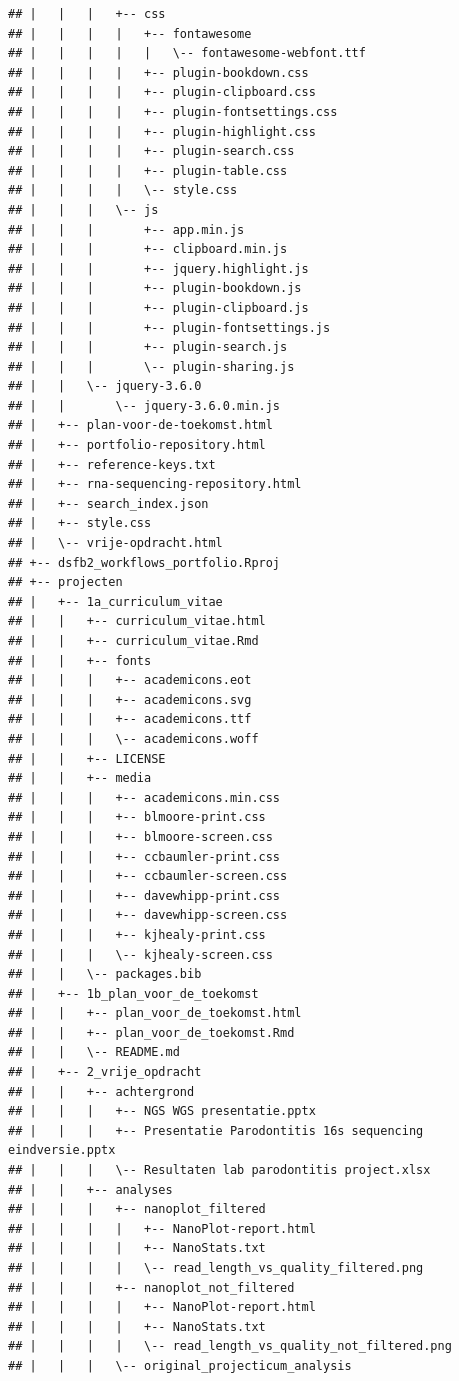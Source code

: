 \documentclass[
]{book}
\begin{document}
\begin{verbatim}
## |   |   |   +-- css
## |   |   |   |   +-- fontawesome
## |   |   |   |   |   \-- fontawesome-webfont.ttf
## |   |   |   |   +-- plugin-bookdown.css
## |   |   |   |   +-- plugin-clipboard.css
## |   |   |   |   +-- plugin-fontsettings.css
## |   |   |   |   +-- plugin-highlight.css
## |   |   |   |   +-- plugin-search.css
## |   |   |   |   +-- plugin-table.css
## |   |   |   |   \-- style.css
## |   |   |   \-- js
## |   |   |       +-- app.min.js
## |   |   |       +-- clipboard.min.js
## |   |   |       +-- jquery.highlight.js
## |   |   |       +-- plugin-bookdown.js
## |   |   |       +-- plugin-clipboard.js
## |   |   |       +-- plugin-fontsettings.js
## |   |   |       +-- plugin-search.js
## |   |   |       \-- plugin-sharing.js
## |   |   \-- jquery-3.6.0
## |   |       \-- jquery-3.6.0.min.js
## |   +-- plan-voor-de-toekomst.html
## |   +-- portfolio-repository.html
## |   +-- reference-keys.txt
## |   +-- rna-sequencing-repository.html
## |   +-- search_index.json
## |   +-- style.css
## |   \-- vrije-opdracht.html
## +-- dsfb2_workflows_portfolio.Rproj
## +-- projecten
## |   +-- 1a_curriculum_vitae
## |   |   +-- curriculum_vitae.html
## |   |   +-- curriculum_vitae.Rmd
## |   |   +-- fonts
## |   |   |   +-- academicons.eot
## |   |   |   +-- academicons.svg
## |   |   |   +-- academicons.ttf
## |   |   |   \-- academicons.woff
## |   |   +-- LICENSE
## |   |   +-- media
## |   |   |   +-- academicons.min.css
## |   |   |   +-- blmoore-print.css
## |   |   |   +-- blmoore-screen.css
## |   |   |   +-- ccbaumler-print.css
## |   |   |   +-- ccbaumler-screen.css
## |   |   |   +-- davewhipp-print.css
## |   |   |   +-- davewhipp-screen.css
## |   |   |   +-- kjhealy-print.css
## |   |   |   \-- kjhealy-screen.css
## |   |   \-- packages.bib
## |   +-- 1b_plan_voor_de_toekomst
## |   |   +-- plan_voor_de_toekomst.html
## |   |   +-- plan_voor_de_toekomst.Rmd
## |   |   \-- README.md
## |   +-- 2_vrije_opdracht
## |   |   +-- achtergrond
## |   |   |   +-- NGS WGS presentatie.pptx
## |   |   |   +-- Presentatie Parodontitis 16s sequencing eindversie.pptx
## |   |   |   \-- Resultaten lab parodontitis project.xlsx
## |   |   +-- analyses
## |   |   |   +-- nanoplot_filtered
## |   |   |   |   +-- NanoPlot-report.html
## |   |   |   |   +-- NanoStats.txt
## |   |   |   |   \-- read_length_vs_quality_filtered.png
## |   |   |   +-- nanoplot_not_filtered
## |   |   |   |   +-- NanoPlot-report.html
## |   |   |   |   +-- NanoStats.txt
## |   |   |   |   \-- read_length_vs_quality_not_filtered.png
## |   |   |   \-- original_projecticum_analysis

\end{verbatim}
\end{document}
